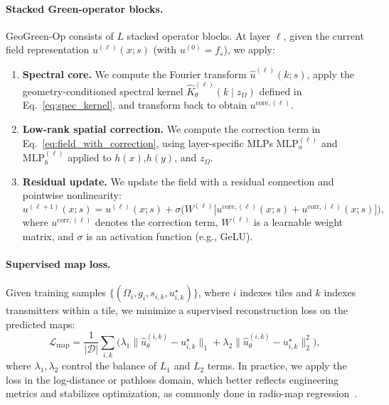 \documentclass{article}
\begin{document}
\vspace{0.3em}
\paragraph{Stacked Green-operator blocks.}
GeoGreen-Op consists of $L$ stacked operator blocks.
At layer $\ell$, given the current field representation
$u^{(\ell)}(x; s)$ (with $u^{(0)} = f_s$), we apply:

\begin{enumerate}[leftmargin=1.5em, itemsep=0.2em]
\item \textbf{Spectral core.}
We compute the Fourier transform $\hat{u}^{(\ell)}(k; s)$,
apply the geometry-conditioned spectral kernel
$\hat{K}^{(\ell)}_\theta(k \mid z_\Omega)$
defined in Eq.~\eqref{eq:spec_kernel},
and transform back to obtain $u^{\text{core},(\ell)}$.

\item \textbf{Low-rank spatial correction.}
We compute the correction term in Eq.~\eqref{eq:field_with_correction},
using layer-specific MLPs $\mathrm{MLP}_a^{(\ell)}$
and $\mathrm{MLP}_b^{(\ell)}$ applied to
$h(x)$,$h(y)$, and $z_\Omega$.

\item \textbf{Residual update.}
We update the field with a residual connection and pointwise nonlinearity:
\begin{equation}
u^{(\ell+1)}(x; s)
= u^{(\ell)}(x; s)
+ \sigma\Big(
W^{(\ell)}
\big[
u^{\text{core},(\ell)}(x; s)
+ u^{\text{corr},(\ell)}(x; s)
\big]
\Big),
\end{equation}
where $u^{\text{corr},(\ell)}$ denotes the correction term,
$W^{(\ell)}$ is a learnable weight matrix, and $\sigma$ is an activation function (e.g., GeLU).
\end{enumerate}
\label{sec:training}


\paragraph{Supervised map loss.}
Given training samples $\{(\Omega_i, g_i, s_{i, k}, u^\star_{i, k})\}$,
where $i$ indexes tiles and $k$ indexes transmitters within a tile,
we minimize a supervised reconstruction loss on the predicted maps:
\begin{equation}
\mathcal{L}_{\text{map}}
= \frac{1}{|\mathcal{D}|}
  \sum_{i, k} \Big(
    \lambda_1 \| \hat{u}_\theta^{(i, k)} - u^{\star}_{i, k} \|_1
  + \lambda_2 \| \hat{u}_\theta^{(i, k)} - u^{\star}_{i, k} \|_2^2
  \Big),
\end{equation}
where $\lambda_1,\lambda_2$ control the balance of $L_1$ and $L_2$ terms.
In practice, we apply the loss in the log-distance or pathloss domain,
which better reflects engineering metrics and stabilizes optimization,
as commonly done in radio-map regression~\cite{romero2022radiomap,feng2025survey}.
\end{document}
